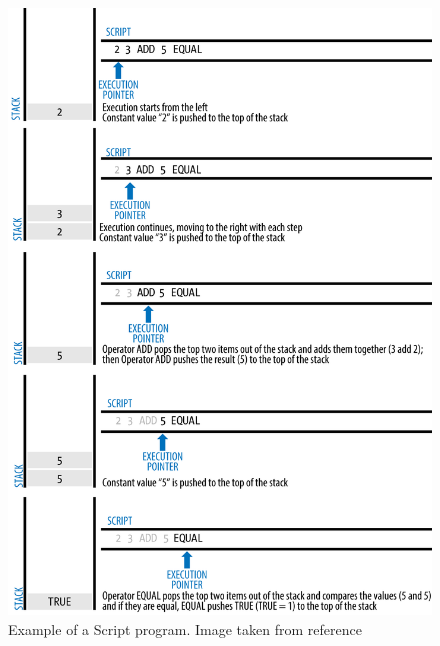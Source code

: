 \begin{figure}[b]
	\centering
	\includegraphics[width=1\linewidth]{img/transaction-script-example.png}
	\caption{Example of a Script program. Image taken from reference \cite{antonopoulos2017mastering}}
	\label{fig:script-example}
\end{figure}
